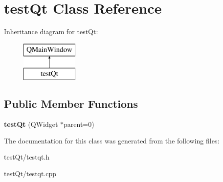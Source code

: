 \hypertarget{classtest_qt}{}\section{test\+Qt Class Reference}
\label{classtest_qt}
Inheritance diagram for test\+Qt\+:\begin{figure}[H]
\begin{center}
\leavevmode
\includegraphics[height=2.000000cm]{classtest_qt}
\end{center}
\end{figure}
\subsection*{Public Member Functions}
\begin{DoxyCompactItemize}
\item 
\hypertarget{classtest_qt_a6ea0c0f87dde2bf02654cbccb5c2223b}{}\label{classtest_qt_a6ea0c0f87dde2bf02654cbccb5c2223b} 
{\bfseries test\+Qt} (Q\+Widget $\ast$parent=0)
\end{DoxyCompactItemize}


The documentation for this class was generated from the following files\+:\begin{DoxyCompactItemize}
\item 
test\+Qt/testqt.\+h\item 
test\+Qt/testqt.\+cpp\end{DoxyCompactItemize}

